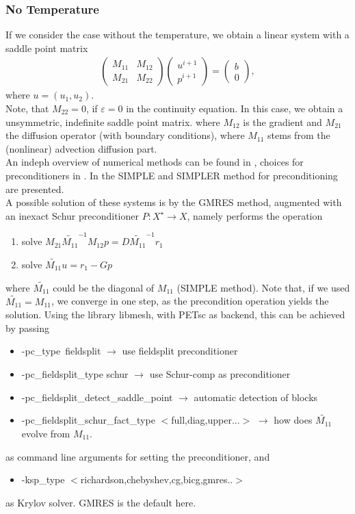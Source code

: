 \documentclass{article}
\begin{document}
\subsubsection{No Temperature}
If we consider the case without the temperature, we obtain a linear system with a saddle point matrix
\begin{align*}
\begin{pmatrix}
M_{11}&M_{12}\\
M_{21}&M_{22}
\end{pmatrix}
\begin{pmatrix}
u^{i+1}\\p^{i+1}
\end{pmatrix}
=
\begin{pmatrix}
b\\0
\end{pmatrix},
\end{align*}
where $u=(u_1,u_2)$.\\
Note, that $M_{22}=0$, if $\varepsilon= 0$ in the continuity equation. In this case, we obtain a unsymmetric, indefinite saddle point matrix. where $M_{12}$ is the gradient and $M_{21}$ the diffusion operator (with boundary conditions), where $M_{11}$ stems from the (nonlinear) advection diffusion part.\\ An indeph overview of numerical methods can be found in \cite{BenziNumSolSaddle}, choices for preconditioners in \cite{ZulehnerPreconditionersPDE,twoprecond07}. In \cite{twoprecond07} the SIMPLE and SIMPLER method for preconditioning are presented. \\A possible solution of these systems is by the GMRES method, augmented with an inexact Schur preconditioner $P:X^\star \to X$, namely performs the operation
\begin{enumerate}
\item solve $M_{21} \tilde{M_{11}}^{-1}M_{12} p = D\tilde{M_{11}}^{-1}r_1$
\item solve $\tilde{M_{11}} u = r_1-Gp$
\end{enumerate}
where $\tilde{M_{11}}$ could be the diagonal of $M_{11}$ (SIMPLE method). Note that, if we used $\tilde{M_{11}} =M_{11}$, we converge in one step, as the precondition operation yields the solution. 
Using the library libmesh, with PETsc as backend, this can be achieved by passing
\begin{itemize}
\item -pc\_type\ fieldsplit $\rightarrow$ use fieldsplit preconditioner
\item -pc\_fieldsplit\_type schur $\rightarrow$ use Schur-comp as preconditioner
\item -pc\_fieldsplit\_detect\_saddle\_point $\rightarrow$ automatic detection of blocks
\item -pc\_fieldsplit\_schur\_fact\_type $<$full,diag,upper...$>$ $\rightarrow$ how does $\tilde{M_{11}}$ evolve from $M_{11}$.
\end{itemize}
as command line arguments for setting the preconditioner, and
\begin{itemize}
\item -ksp\_type $<$richardson,chebyshev,cg,bicg,gmres..$>$
\end{itemize}
as Krylov solver. GMRES is the default here.
\end{document}
